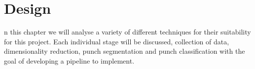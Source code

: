%
%


\let\textcircled=\pgftextcircled
\chapter{Design}

n this chapter we will analyse a variety of different techniques for their suitability for this project. Each individual stage will be discussed, collection of data, dimensionality reduction, punch segmentation and punch classification with the goal of developing a pipeline to implement.




